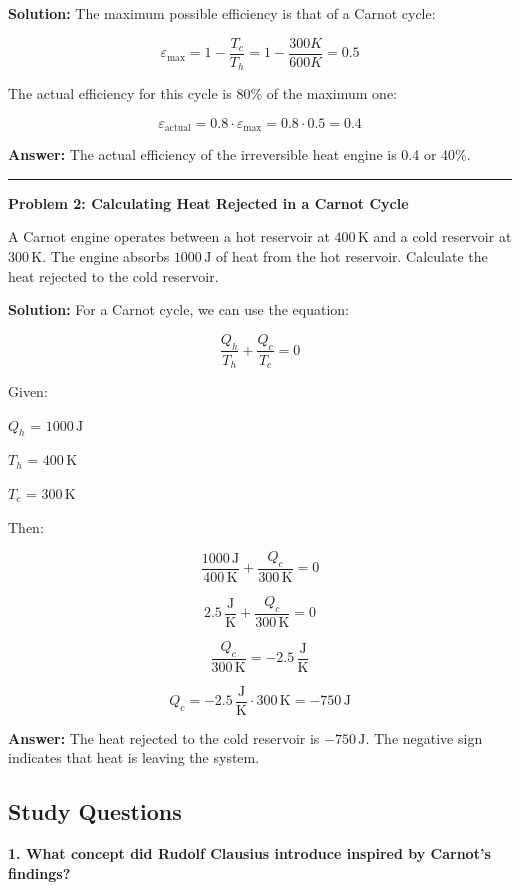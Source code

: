 \documentclass[
  9pt,
]{extbook}
\theoremstyle{definition}
\theoremstyle{definition}
\theoremstyle{definition}
\theoremstyle{definition}
\theoremstyle{remark}
\begin{document}
\textbf{Solution:} The maximum possible efficiency is that of a Carnot cycle:

\[\varepsilon_{\text{max}} = 1 - \frac{T_c}{T_h} = 1 - \frac{300 K}{600 K} = 0.5\]

The actual efficiency for this cycle is 80\% of the maximum one:

\[\varepsilon_{\text{actual}} = 0.8 \cdot \varepsilon_{\text{max}} = 0.8 \cdot 0.5 = 0.4\]

\textbf{Answer:} The actual efficiency of the irreversible heat engine is 0.4 or 40\%.

\begin{center}\rule{0.5\linewidth}{0.5pt}\end{center}

\textbf{Problem 2: Calculating Heat Rejected in a Carnot Cycle}

A Carnot engine operates between a hot reservoir at \(400\,\text{K}\) and a cold reservoir at \(300\,\text{K}\). The engine absorbs \(1000\,\text{J}\) of heat from the hot reservoir. Calculate the heat rejected to the cold reservoir.

\textbf{Solution:} For a Carnot cycle, we can use the equation:

\[\frac{Q_h}{T_h} + \frac{Q_c}{T_c} = 0\]

Given:

\(Q_h\) = \(1000\,\text{J}\)

\(T_h\) = \(400\,\text{K}\)

\(T_c\) = \(300\,\text{K}\)

Then:

\[\frac{1000\,\text{J}}{400\,\text{K}} + \frac{Q_c}{300\,\text{K}} = 0\]

\[2.5\,\frac{\text{J}}{\text{K}} + \frac{Q_c}{300\,\text{K}} = 0\]

\[\frac{Q_c}{300\,\text{K}} = -2.5\,\frac{\text{J}}{\text{K}}\]

\[Q_c = -2.5\,\frac{\text{J}}{\text{K}} \cdot 300\,\text{K} = -750\,\text{J}\]

\textbf{Answer:} The heat rejected to the cold reservoir is \(-750\,\text{J}\). The negative sign indicates that heat is leaving the system.

\subsection{Study Questions}\label{quest6}

\textbf{1. What concept did Rudolf Clausius introduce inspired by Carnot's findings?}
\end{document}
